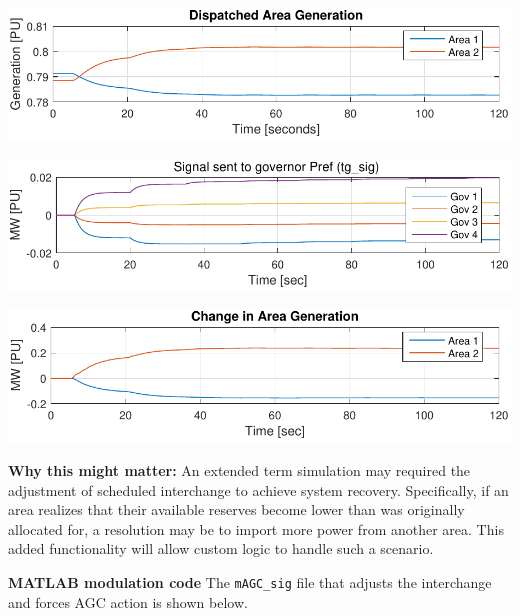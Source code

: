 \begin{minipage}{.5\linewidth}

\includegraphics[width=\linewidth]{examples/agcMod/areaGen}

\vspace{1em}
\includegraphics[width=\linewidth]{examples/agcMod/tgSigs}

\vspace{1em}
\includegraphics[width=\linewidth]{examples/agcMod/changeGen}
\end{minipage}

\textbf{Why this might matter: }
An extended term simulation may required the adjustment of scheduled interchange to achieve system recovery.
Specifically, if an area realizes that their available reserves become lower than was originally allocated for, a resolution may be to import more power from another area.
This added functionality will allow custom logic to handle such a scenario.

\pagebreak
\textbf{MATLAB modulation code} 
The \verb|mAGC_sig| file that adjusts the interchange and forces AGC action is shown below.


